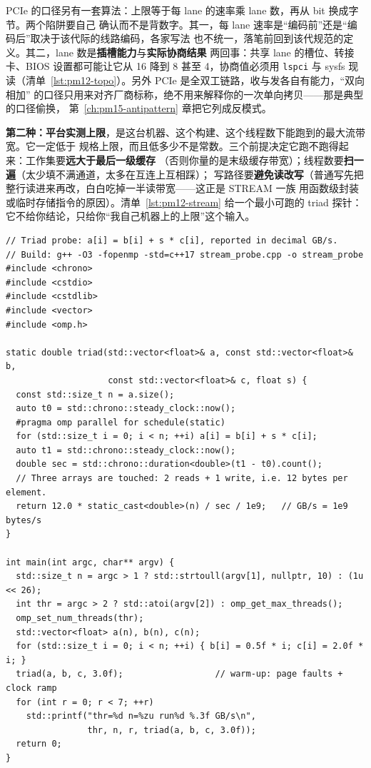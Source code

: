 \documentclass[12pt,a4paper,fontset=fandol]{ctexbook}
\newcommand{\Tp}[1]{\texttt{#1}}
\begin{document}
PCIe 的口径另有一套算法：上限等于每 lane 的速率乘 lane 数，再从 bit 换成字节。两个陷阱要自己
确认而不是背数字。其一，每 lane 速率是``编码前''还是``编码后''取决于该代际的线路编码，各家写法
也不统一，落笔前回到该代规范的定义。其二，lane 数是\textbf{插槽能力}与\textbf{实际协商结果}
两回事：共享 lane 的槽位、转接卡、BIOS 设置都可能让它从 16 降到 8 甚至 4，协商值必须用 \Tp{lspci}
与 sysfs 现读（清单~\ref{lst:pm12-topo}）。另外 PCIe 是全双工链路，收与发各自有能力，``双向相加''
的口径只用来对齐厂商标称，绝不用来解释你的一次单向拷贝——那是典型的口径偷换，
第~\ref{ch:pm15-antipattern} 章把它列成反模式。

\textbf{第二种：平台实测上限}，是这台机器、这个构建、这个线程数下能跑到的最大流带宽。它一定低于
规格上限，而且低多少不是常数。三个前提决定它跑不跑得起来：工作集要\textbf{远大于最后一级缓存}
（否则你量的是末级缓存带宽）；线程数要\textbf{扫一遍}（太少填不满通道，太多在互连上互相踩）；
写路径要\textbf{避免读改写}（普通写先把整行读进来再改，白白吃掉一半读带宽——这正是 STREAM 一族
用函数级封装或临时存储指令的原因）。清单~\ref{lst:pm12-stream} 给一个最小可跑的 triad 探针：
它不给你结论，只给你``我自己机器上的上限''这个输入。

\begin{lstlisting}[style=cppstyle,caption={主机侧流带宽探针（triad）：数组大小、线程数与重复次数都由命令行给，数值由运行者得到},label={lst:pm12-stream}]
// Triad probe: a[i] = b[i] + s * c[i], reported in decimal GB/s.
// Build: g++ -O3 -fopenmp -std=c++17 stream_probe.cpp -o stream_probe
#include <chrono>
#include <cstdio>
#include <cstdlib>
#include <vector>
#include <omp.h>

static double triad(std::vector<float>& a, const std::vector<float>& b,
                    const std::vector<float>& c, float s) {
  const std::size_t n = a.size();
  auto t0 = std::chrono::steady_clock::now();
  #pragma omp parallel for schedule(static)
  for (std::size_t i = 0; i < n; ++i) a[i] = b[i] + s * c[i];
  auto t1 = std::chrono::steady_clock::now();
  double sec = std::chrono::duration<double>(t1 - t0).count();
  // Three arrays are touched: 2 reads + 1 write, i.e. 12 bytes per element.
  return 12.0 * static_cast<double>(n) / sec / 1e9;   // GB/s = 1e9 bytes/s
}

int main(int argc, char** argv) {
  std::size_t n = argc > 1 ? std::strtoull(argv[1], nullptr, 10) : (1u << 26);
  int thr = argc > 2 ? std::atoi(argv[2]) : omp_get_max_threads();
  omp_set_num_threads(thr);
  std::vector<float> a(n), b(n), c(n);
  for (std::size_t i = 0; i < n; ++i) { b[i] = 0.5f * i; c[i] = 2.0f * i; }
  triad(a, b, c, 3.0f);                  // warm-up: page faults + clock ramp
  for (int r = 0; r < 7; ++r)
    std::printf("thr=%d n=%zu run%d %.3f GB/s\n",
                thr, n, r, triad(a, b, c, 3.0f));
  return 0;
}
\end{lstlisting}
\end{document}
